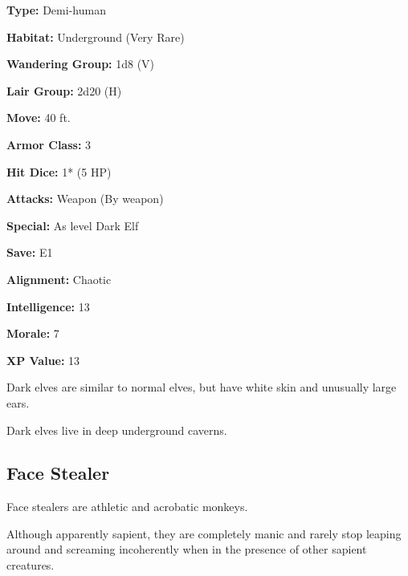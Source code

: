 \begin{multicols*}{2}
{\textbf{Type:} Demi-human

\textbf{Habitat:} Underground (Very Rare)

\textbf{Wandering Group:} 1d8 (V)

\textbf{Lair Group:} 2d20 (H)

\textbf{Move:} 40 ft.

\textbf{Armor Class:} 3

\textbf{Hit Dice:} 1* (5 HP)

\textbf{Attacks:} Weapon (By weapon)

\textbf{Special:} As  level Dark Elf

\textbf{Save:} E1

\textbf{Alignment:} Chaotic

\textbf{Intelligence:} 13

\textbf{Morale:} 7

\textbf{XP Value:} 13}

Dark elves are similar to normal elves, but have white skin and unusually large ears.

Dark elves live in deep underground caverns.

\subsection{Face Stealer}

Face stealers are athletic and acrobatic monkeys.

Although apparently sapient, they are completely manic and rarely stop leaping around and screaming incoherently when in the presence of other sapient creatures.


\end{multicols*}
